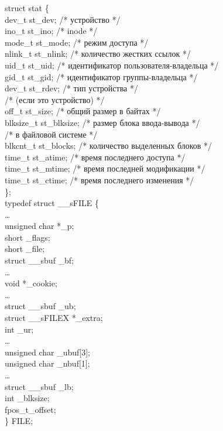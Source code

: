 \documentclass[14pt, a4paper]{extarticle}
\begin{document}
\noindent struct stat \{\\
\indent dev\_t st\_dev; /* устройство */ \\
\indent ino\_t st\_ino; /* inode */\\
\indent mode\_t st\_mode; /* режим доступа */\\
\indent nlink\_t st\_nlink; /* количество жестких ссылок */\\
\indent uid\_t st\_uid; /* идентификатор пользователя-владельца */\\
\indent gid\_t st\_gid; /* идентификатор группы-владельца */\\
\indent dev\_t st\_rdev; /* тип устройства */\\
\indent /* (если это устройство) */\\
\indent off\_t st\_size; /* общий размер в байтах */\\
\indent blksize\_t st\_blksize; /* размер блока ввода-вывода */\\
\indent /* в файловой системе */\\
\indent blkcnt\_t st\_blocks; /* количество выделенных блоков */\\
\indent time\_t st\_atime; /* время последнего доступа */\\
\indent time\_t st\_mtime; /* время последней модификации */\\
\indent time\_t st\_ctime; /* время последнего изменения */\\
\};\\
typedef struct \_\_sFILE \{\\
\indent …\\
\indent unsigned char *\_p;\\
\indent short \_flags;\\
\indent short \_file;\\
\indent struct \_\_sbuf \_bf;\\
\indent …\\
\indent void *\_cookie;\\
\indent …\\
\indent struct \_\_sbuf \_ub;\\
\indent struct \_\_sFILEX *\_extra;\\
\indent int \_ur;\\
\indent …\\
\indent unsigned char \_ubuf[3];\\
\indent unsigned char \_nbuf[1];\\
\indent …\\
\indent struct \_\_sbuf \_lb;\\
\indent int \_blksize;\\
\indent fpos\_t\_offset;\\
\} FILE;\\
\end{document}
